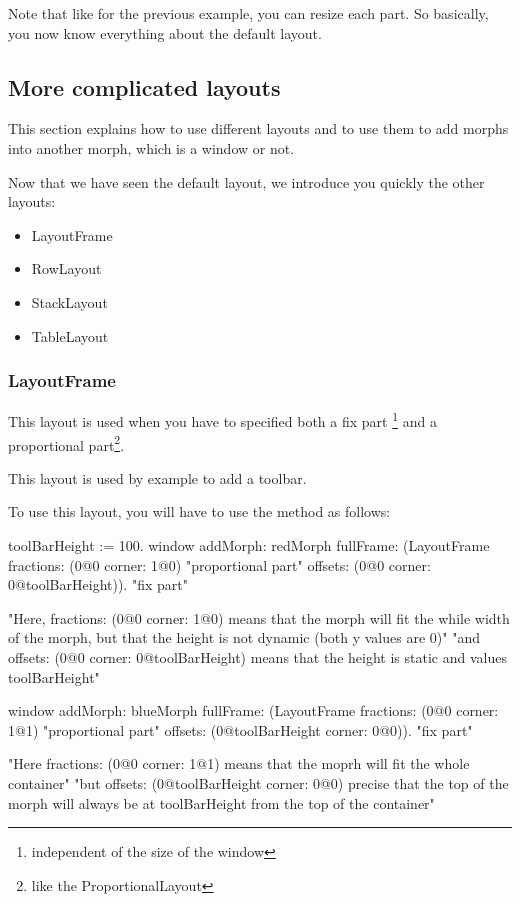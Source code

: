 \documentclass[a4paper,10pt,twoside]{book}
\begin{document}
Note that like for the previous example, you can resize each part. So basically, you now know everything about the default layout.


%
%


\subsection{More complicated layouts}

This section explains how to use different layouts and to use them to add morphs into another morph, which is a window or not.

Now that we have seen the default layout, we introduce you quickly the other layouts:
\begin{itemize}
	\item LayoutFrame
	\item RowLayout
	\item StackLayout
	\item TableLayout
\end{itemize}

\subsubsection{LayoutFrame}

This layout is used when you have to specified both a fix part \footnote{independent of the size of the window} and a proportional part\footnote{like the ProportionalLayout}.

This layout is used by example to add a toolbar.

To use this layout, you will have to use the method  as follows:

\begin{code}{}
toolBarHeight := 100.
window
	addMorph: redMorph
	fullFrame: (LayoutFrame
				fractions: (0@0 corner: 1@0) "proportional part"
				offsets: (0@0 corner: 0@toolBarHeight)). "fix part"
				
				"Here, fractions: (0@0 corner: 1@0) means that the morph will fit the while width of the morph, but that the height is not dynamic (both y values are 0)"
				"and offsets: (0@0 corner: 0@toolBarHeight) means that the height is static and values toolBarHeight"
				
window
	addMorph: blueMorph
	fullFrame: (LayoutFrame
				fractions: (0@0 corner: 1@1) "proportional part"
				offsets: (0@toolBarHeight corner: 0@0)). "fix part"
				
	"Here fractions: (0@0 corner: 1@1) means that the moprh will	fit the whole container"
	"but offsets: (0@toolBarHeight corner: 0@0) precise that the top of the morph will always be at toolBarHeight from the top of the container"
\end{code}
\end{document}
